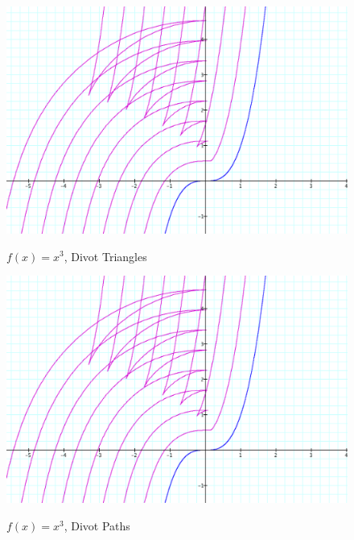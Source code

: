 \begin{figure}[h!]
  \begin{minipage}[b]{\w}
    \centering
    \label{example:6}
    \includegraphics[width=\fw]{img/03-some-examples/06.png}
    \caption{$f(x) = x^3$, Divot Triangles}
    \vspace{4ex}
  \end{minipage} %
  \begin{minipage}[b]{0.5\linewidth}
    \centering
    \label{example:7}
    \includegraphics[width=\fw]{img/03-some-examples/07.png}
    \caption{$f(x) = x^3$, Divot Paths}
    \vspace{4ex}
  \end{minipage} %
\end{figure}

\renewcommand\w{0.80\linewidth}

